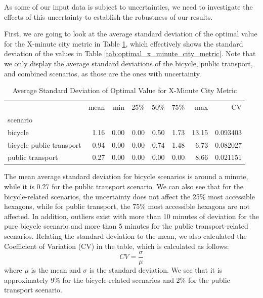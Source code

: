 As some of our input data is subject to uncertainties, we need to investigate the effects of this uncertainty to establish the robustness of our results.

First, we are going to look at the average standard deviation of the optimal value for the X-minute city metric in Table \ref{tab:average_standard_deviation_of_optimal_value_for_x_minute_city_metric}, which effectively shows the standard deviation of the values in Table \ref{tab:optimal_x_minute_city_metric}.
Note that we only display the average standard deviations of the bicycle, public transport, and combined scenarios, as those are the ones with uncertainty.

\begin{table}
  \caption{Average Standard Deviation of Optimal Value for X-Minute City Metric}
  \label{tab:average_standard_deviation_of_optimal_value_for_x_minute_city_metric}
  \begin{center}
    \begin{tabular}{lrrrrrrr}
     & mean & min & 25\% & 50\% & 75\% & max & CV \\
    scenario &  &  &  &  &  &  &  \\
    bicycle & 1.16 & 0.00 & 0.00 & 0.50 & 1.73 & 13.15 & 0.093403 \\
    bicycle public transport & 0.94 & 0.00 & 0.00 & 0.74 & 1.48 & 6.73 & 0.082027 \\
    public transport & 0.27 & 0.00 & 0.00 & 0.00 & 0.00 & 8.66 & 0.021151 \\
    \end{tabular}
  \end{center}
\end{table}


The mean average standard deviation for bicycle scenarios is around a minute, while it is 0.27 for the public transport scenario.
We can also see that for the bicycle-related scenarios, the uncertainty does not affect the 25\% most accessible hexagons, while for public transport, the 75\% most accessible hexagons are not affected.
In addition, outliers exist with more than 10 minutes of deviation for the pure bicycle scenario and more than 5 minutes for the public transport-related scenarios.
Relating the standard deviation to the mean, we also calculated the Coefficient of Variation (CV) in the table, which is calculated as follows:
$$ CV = \frac{\sigma}{\mu} $$
where $\mu$ is the mean and $\sigma$ is the standard deviation.
We see that it is approximately 9\% for the bicycle-related scenarios and 2\% for the public transport scenario.

